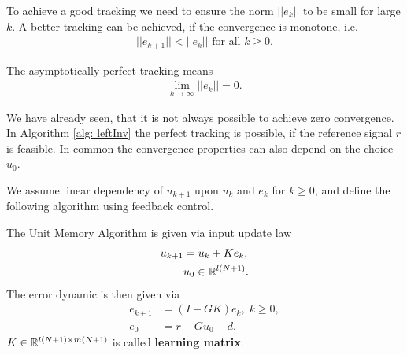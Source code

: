 To achieve a good tracking we need to ensure the norm $||e_k||$ to be small for large $k$. 
A better tracking can be achieved, if the convergence is monotone, i.e. 
\begin{align}
||e_{k+1} || < ||e_k|| \text{ for all } k \geq 0.
\end{align}

The asymptotically perfect tracking means
\begin{align}
\lim_{k\to\infty} ||e_k|| = 0.
\end{align}

We have already seen, that it is not always possible to achieve zero convergence. In Algorithm \ref{alg: leftInv} the perfect tracking is possible, if the reference signal $r$ is feasible. In common the convergence properties can also depend on the choice $u_0$.



We assume linear dependency of $u_{k+1}$ upon $u_k$ and $e_k$ for $k \geq 0$, and define the following algorithm using feedback control. 
\begin{alg}
	\label{alg: unitMemory}
	The Unit Memory Algorithm is given via input update law 
	\begin{align}
	\label{eq:clPlant}
	\begin{split}
	u_{k+1} &= u_k + K e_k, \\
	& u_0 \in {\mathbb{R}}^{l (N+1)}.
	\end{split}
	\end{align}	 
	The error dynamic is then given via
	\begin{align}
	e _{k+1} &= (I - G K) e_{k}, \; k \geq 0,\\
	e_0 &= r -  Gu_0 -d.
	\end{align}
	$K \in {\mathbb{R}}^{l(N+1) \times m(N+1)}$ is called \textbf{learning matrix}. 
\end{alg}


